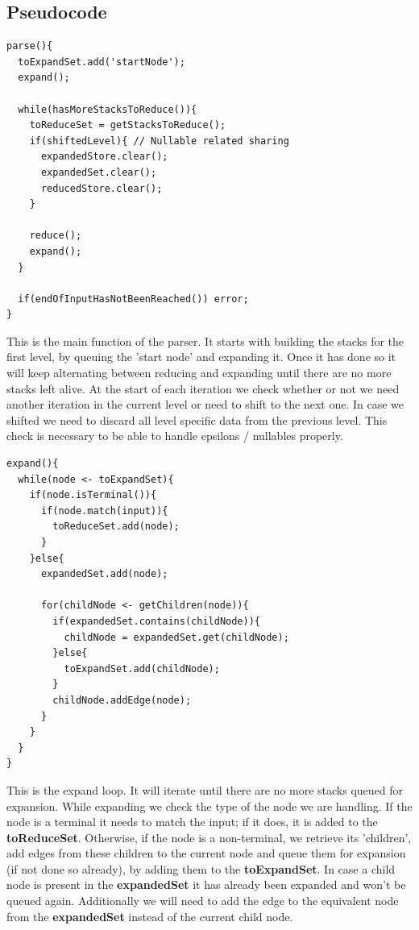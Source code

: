\documentclass[a4paper,10pt]{article}
\begin{document}
\subsection{Pseudocode}

{\small
\begin{verbatim}
parse(){
  toExpandSet.add('startNode');
  expand();
  
  while(hasMoreStacksToReduce()){
    toReduceSet = getStacksToReduce();
    if(shiftedLevel){ // Nullable related sharing
      expandedStore.clear();
      expandedSet.clear();
      reducedStore.clear();
    }
    
    reduce();
    expand();
  }
  
  if(endOfInputHasNotBeenReached()) error;
}
\end{verbatim}
}

This is the main function of the parser. It starts with building the stacks for the first level, by queuing the 'start node' and expanding it. Once it has done so it will keep alternating between reducing and expanding until there are no more stacks left alive. At the start of each iteration we check whether or not we need another iteration in the current level or need to shift to the next one. In case we shifted we need to discard all level specific data from the previous level. This check is necessary to be able to handle epsilons / nullables properly.

{\small
\begin{verbatim}
expand(){
  while(node <- toExpandSet){
    if(node.isTerminal()){
      if(node.match(input)){
        toReduceSet.add(node);
      }
    }else{
      expandedSet.add(node);
      
      for(childNode <- getChildren(node)){
        if(expandedSet.contains(childNode)){
          childNode = expandedSet.get(childNode);
        }else{
          toExpandSet.add(childNode);
        }
        childNode.addEdge(node);
      }
    }
  }
}
\end{verbatim}
}

This is the expand loop. It will iterate until there are no more stacks queued for expansion. While expanding we check the type of the node we are handling. If the node is a terminal it needs to match the input; if it does, it is added to the {\bf toReduceSet}. Otherwise, if the node is a non-terminal, we retrieve its 'children', add edges from these children to the current node and queue them for expansion (if not done so already), by adding them to the {\bf toExpandSet}. In case a child node is present in the {\bf expandedSet} it has already been expanded and won't be queued again. Additionally we will need to add the edge to the equivalent node from the {\bf expandedSet} instead of the current child node.
\end{document}
